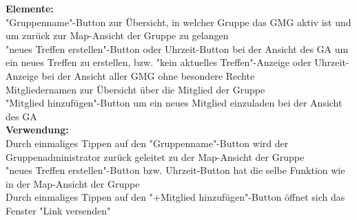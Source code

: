 \textbf{Elemente:}\\
"Gruppenname"-Button zur Übersicht, in welcher Gruppe das GMG aktiv ist und um zurück zur Map-Ansicht der Gruppe zu gelangen\\
"neues Treffen erstellen"-Button oder Uhrzeit-Button bei der Ansicht des GA um ein neues Treffen zu erstellen, bzw. "kein aktuelles Treffen"-Anzeige oder Uhrzeit-Anzeige bei der Ansicht aller GMG ohne besondere Rechte\\
Mitgliedernamen zur Übersicht über die Mitglied der Gruppe\\
"Mitglied hinzufügen"-Button um ein neues Mitglied einzuladen bei der Ansicht des GA\\
\textbf{Verwendung:}\\
Durch einmaliges Tippen auf den "Gruppenname"-Button wird der Gruppenadministrator zurück geleitet zu der Map-Ansicht der Gruppe\\
"neues Treffen erstellen"-Button bzw. Uhrzeit-Button hat die selbe Funktion wie in der Map-Ansicht der Gruppe\\
Durch einmaliges Tippen auf den "+Mitglied hinzufügen"-Button öffnet sich das Fenster "Link versenden"\\ \\

